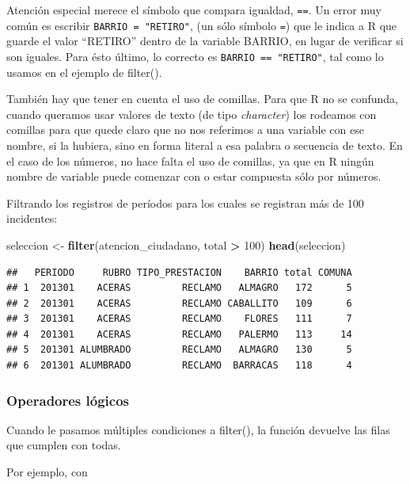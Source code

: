 \documentclass[spanish,]{book}
\newenvironment{Shaded}{\begin{snugshade}}{\end{snugshade}}
\newcommand{\DecValTok}[1]{\textcolor[rgb]{0.00,0.00,0.81}{#1}}
\newcommand{\KeywordTok}[1]{\textcolor[rgb]{0.13,0.29,0.53}{\textbf{#1}}}
\newcommand{\NormalTok}[1]{#1}
\newcommand{\OperatorTok}[1]{\textcolor[rgb]{0.81,0.36,0.00}{\textbf{#1}}}
\newcommand{\StringTok}[1]{\textcolor[rgb]{0.31,0.60,0.02}{#1}}
\begin{document}
Atención especial merece el símbolo que compara igualdad, \texttt{==}. Un error muy común es escribir \texttt{BARRIO\ =\ "RETIRO"}, (un sólo símbolo \texttt{=}) que le indica a R que guarde el valor ``RETIRO'' dentro de la variable BARRIO, en lugar de verificar si son iguales. Para ésto último, lo correcto es \texttt{BARRIO\ ==\ "RETIRO"}, tal como lo usamos en el ejemplo de filter().

También hay que tener en cuenta el uso de comillas. Para que R no se confunda, cuando queramos usar valores de texto (de tipo \emph{character}) los rodeamos con comillas para que quede claro que no nos referimos a una variable con ese nombre, si la hubiera, sino en forma literal a esa palabra o secuencia de texto. En el caso de los números, no hace falta el uso de comillas, ya que en R ningún nombre de variable puede comenzar con o estar compuesta sólo por números.

Filtrando los registros de períodos para los cuales se registran más de 100 incidentes:

\begin{Shaded}
\begin{Highlighting}[]
\NormalTok{seleccion <-}\StringTok{ }\KeywordTok{filter}\NormalTok{(atencion_ciudadano, total }\OperatorTok{>}\StringTok{ }\DecValTok{100}\NormalTok{)}
\KeywordTok{head}\NormalTok{(seleccion)}
\end{Highlighting}
\end{Shaded}

\begin{verbatim}
##   PERIODO     RUBRO TIPO_PRESTACION    BARRIO total COMUNA
## 1  201301    ACERAS         RECLAMO   ALMAGRO   172      5
## 2  201301    ACERAS         RECLAMO CABALLITO   109      6
## 3  201301    ACERAS         RECLAMO    FLORES   111      7
## 4  201301    ACERAS         RECLAMO   PALERMO   113     14
## 5  201301 ALUMBRADO         RECLAMO   ALMAGRO   130      5
## 6  201301 ALUMBRADO         RECLAMO  BARRACAS   118      4
\end{verbatim}

\hypertarget{operadores-luxf3gicos}{%
\subsubsection{Operadores lógicos}\label{operadores-luxf3gicos}}

Cuando le pasamos múltiples condiciones a filter(), la función devuelve las filas que cumplen con todas.

Por ejemplo, con
\end{document}

